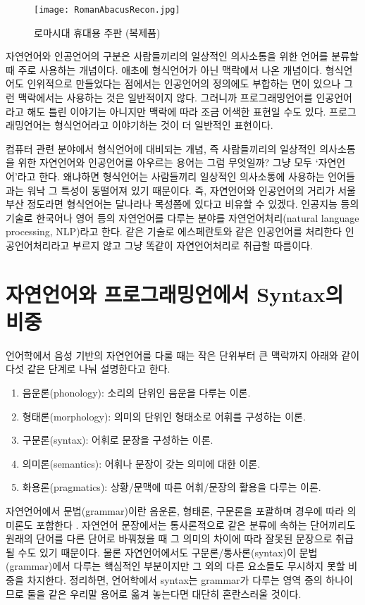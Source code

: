 \begin{figure}[b]\center
\texttt{[image: RomanAbacusRecon.jpg]}
\caption{로마시대 휴대용 주판 (복제품)\label{fig:RomanAbacus}\\
          }
\end{figure}

자연언어와 인공언어의 구분은 사람들끼리의 일상적인 의사소통을 위한 언어를
분류할 때 주로 사용하는 개념이다. 애초에 형식언어가 아닌 맥락에서 나온 개념이다.
형식언어도 인위적으로 만들었다는 점에서는 인공언어의 정의에도 부합하는 면이 있으나
그런 맥락에서는 사용하는 것은 일반적이지 않다. 그러니까 프로그래밍언어를
인공언어라고 해도 틀린 이야기는 아니지만 맥락에 따라 조금 어색한 표현일 수도 있다.
프로그래밍언어는 형식언어라고 이야기하는 것이 더 일반적인 표현이다.

컴퓨터 관련 분야에서 형식언어에 대비되는 개념, 즉 사람들끼리의 일상적인
의사소통을 위한 자연언어와 인공언어를 아우르는 용어는 그럼 무엇일까?
그냥 모두 `자연언어'라고 한다. 왜냐하면 형식언어는 사람들끼리 일상적인
의사소통에 사용하는 언어들과는 워낙 그 특성이 동떨어져 있기 때문이다.
즉, 자연언어와 인공언어의 거리가 서울 부산 정도라면 형식언어는 달나라나
목성쯤에 있다고 비유할 수 있겠다. 인공지능 등의 기술로 한국어나 영어 등의
자연언어를 다루는 분야를 자연언어처리(natural language processing, NLP)라고 한다.
같은 기술로 에스페란토와 같은 인공언어를 처리한다 인공언어처리라고 부르지 않고
그냥 똑같이 자연언어처리로 취급할 따름이다.

\section{자연언어와 프로그래밍언에서 Syntax의 비중}
\label{sec:NatProgSyn}
%
%
언어학에서 음성 기반의 자연언어를 다룰 때는
작은 단위부터 큰 맥락까지 아래와 같이 다섯 같은 단계로 나눠 설명한다고 한다.
\begin{enumerate}\tightlist
    \item 음운론(phonology):
    소리의 단위인 음운을 다루는 이론.
    \item 형태론(morphology):
    의미의 단위인 형태소로 어휘를 구성하는 이론.
    \item 구문론(syntax):
    어휘로 문장을 구성하는 이론.
    \item 의미론(semantics):
    어휘나 문장이 갖는 의미에 대한 이론.
    \item 화용론(pragmatics):
    상황/문맥에 따른 어휘/문장의 활용을 다루는 이론.
\end{enumerate}
자연언어에서 문법(grammar)이란 음운론, 형태론, 구문론을 포괄하며 경우에 따라
의미론도 포함한다 \cite{IntroEngSem}. 자연언어 문장에서는 통사론적으로 같은
분류에 속하는 단어끼리도 원래의 단어를 다른 단어로 바꿔쳤을 때 그 의미의
차이에 따라 잘못된 문장으로 취급될 수도 있기 때문이다. 물론 자연언어에서도
구문론/통사론(syntax)이 문법(grammar)에서 다루는 핵심적인 부분이지만
그 외의 다른 요소들도 무시하지 못할 비중을 차지한다. 정리하면,
언어학에서 syntax는 grammar가 다루는 영역 중의 하나이므로
둘을 같은 우리말 용어로 옮겨 놓는다면 대단히 혼란스러울 것이다.

